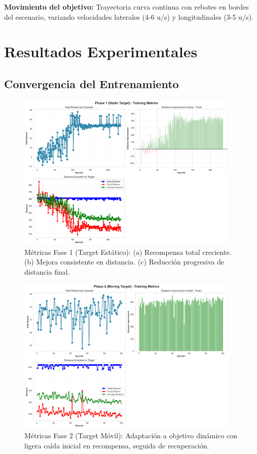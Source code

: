 \documentclass[12pt,a4paper]{article}
\begin{document}
\textbf{Movimiento del objetivo:} Trayectoria curva continua con rebotes en bordes del escenario, variando velocidades laterales (4-6 u/s) y longitudinales (3-5 u/s).

\section{Resultados Experimentales}

\subsection{Convergencia del Entrenamiento}

\begin{figure}[H]
    \centering
    \includegraphics[width=0.95\textwidth]{logs/episode_metrics_phase1.png}
    \caption{Métricas Fase 1 (Target Estático): (a) Recompensa total creciente. (b) Mejora consistente en distancia. (c) Reducción progresiva de distancia final.}
\end{figure}

\begin{figure}[H]
    \centering
    \includegraphics[width=0.95\textwidth]{logs/episode_metrics_phase2.png}
    \caption{Métricas Fase 2 (Target Móvil): Adaptación a objetivo dinámico con ligera caída inicial en recompensa, seguida de recuperación.}
\end{figure}
\end{document}
